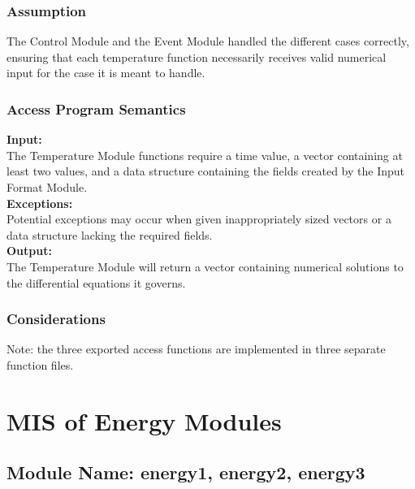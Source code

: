 \documentclass[12pt]{article}
\begin{document}
\subsubsection{Assumption}
The Control Module and the Event Module handled the different cases correctly,
 ensuring that each temperature function necessarily receives valid numerical input 
  for the case it is meant to handle.


\subsubsection{Access Program Semantics}

\noindent \textbf{Input:}\\
The Temperature Module functions require a time value, a vector containing at 
least two values, and a data structure containing the fields created by the 
Input Format Module. \\

\noindent \textbf{Exceptions:}\\
Potential exceptions may occur when given inappropriately sized
vectors or a data structure lacking the required fields.\\

\noindent \textbf{Output:}\\
The Temperature Module will return a vector containing numerical solutions to
the differential equations it governs. \\

\subsubsection{Considerations}
Note: the three exported access functions are implemented in three separate function files. 


\section{MIS of Energy Modules}

\subsection{Module Name: energy1, energy2, energy3}
\end{document}
